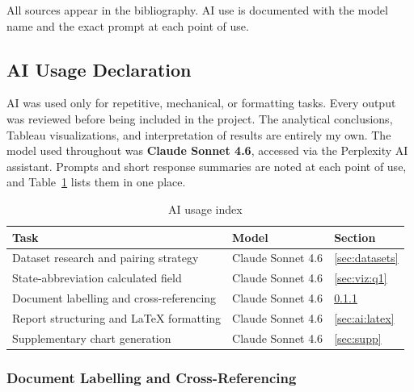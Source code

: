 \documentclass[a4paper,11pt]{article}
\begin{document}
\par
All sources appear in the bibliography. AI use is documented with the model
name and the exact prompt at each point of use.

\subsection{AI Usage Declaration}\label{sec:ai}

\par
AI was used only for repetitive, mechanical, or formatting tasks. Every output
was reviewed before being included in the project. The analytical conclusions,
Tableau visualizations, and interpretation of results are entirely my own. The
model used throughout was \textbf{Claude Sonnet 4.6}, accessed via the
Perplexity AI assistant. Prompts and short response summaries are noted at
each point of use, and Table~\ref{tab:ai} lists them in one place.

\begin{table}[H]
	\centering
	\renewcommand{\arraystretch}{1.35}
	\begin{tabular}{p{8.0cm} p{3.6cm} p{1.6cm}}
		\toprule
		\rowcolor{utaddark}
		\color{white}\textbf{Task}               &
		\color{white}\textbf{Model}              &
		\color{white}\textbf{Section}                                                      \\
		\midrule
		\rowcolor{utadrow}
		Dataset research and pairing strategy    & Claude Sonnet 4.6 & \ref{sec:datasets}  \\
		State-abbreviation calculated field      & Claude Sonnet 4.6 & \ref{sec:viz:q1}    \\
		\rowcolor{utadrow}
		Document labelling and cross-referencing & Claude Sonnet 4.6 & \ref{sec:ai:labels} \\
		Report structuring and LaTeX formatting  & Claude Sonnet 4.6 & \ref{sec:ai:latex}  \\
		\rowcolor{utadrow}
		Supplementary chart generation           & Claude Sonnet 4.6 & \ref{sec:supp}      \\
		\bottomrule
	\end{tabular}
	\caption{AI usage index}
	\label{tab:ai}
\end{table}

\subsubsection{Document Labelling and Cross-Referencing}\label{sec:ai:labels}
\end{document}
